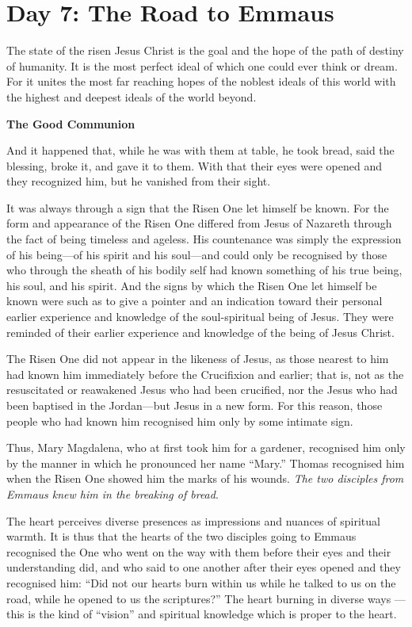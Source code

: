\section{Day 7: The Road to Emmaus}

The state of the risen Jesus Christ is the goal and the hope of the path of destiny of humanity. It is the most perfect ideal of which one could ever think or dream. For it unites the most far reaching hopes of the noblest ideals of this world with the highest and deepest ideals of the world beyond.

\textbf{The Good Communion}

And it happened that, while he was with them at table, he took bread, said the blessing, broke it, and gave it to them. With that their eyes were opened and they recognized him, but he vanished from their sight. 

\begin{quotex}
It was always through a sign that the Risen One let himself be known. For the form and appearance of the Risen One differed from Jesus of Nazareth through the fact of being timeless and ageless. His countenance was simply the expression of his being—of his spirit and his soul—and could only be recognised by those who through the sheath of his bodily self had known something of his true being, his soul, and his spirit. And the signs by which the Risen One let himself be known were such as to give a pointer and an indication toward their personal earlier experience and knowledge of the soul-spiritual being of Jesus. They were reminded of their earlier experience and knowledge of the being of Jesus Christ. 

\end{quotex}
The Risen One did not appear in the likeness of Jesus, as those nearest to him had known him immediately before the Crucifixion and earlier; that is, not as the resuscitated or reawakened Jesus who had been crucified, nor the Jesus who had been baptised in the Jordan—but Jesus in a new form. For this reason, those people who had known him recognised him only by some intimate sign.

Thus, Mary Magdalena, who at first took him for a gardener, recognised him only by the manner in which he pronounced her name ``Mary.'' Thomas recognised him when the Risen One showed him the marks of his wounds. \emph{The two disciples from Emmaus knew him in the breaking of bread}.

\begin{quotex}
The heart perceives diverse presences as impressions and nuances of spiritual warmth. It is thus that the hearts of the two disciples going to Emmaus recognised the One who went on the way with them before their eyes and their understanding did, and who said to one another after their eyes opened and they recognised him: ``Did not our hearts burn within us while he talked to us on the road, while he opened to us the scriptures?'' The heart burning in diverse ways — this is the kind of ``vision'' and spiritual knowledge which is proper to the heart. 

\end{quotex}


